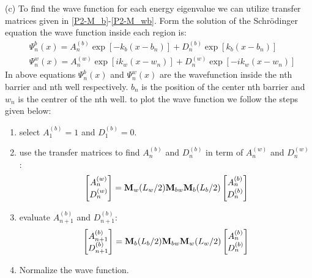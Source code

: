 \begin{homeworkProblem}
\begin{homeworkSection}{(c)}
To find the wave function  for each energy eigenvalue we can utilize transfer matrices given in \eqref{P2-M_b}-\eqref{P2-M_wb}. Form the solution of the Schr\"odinger equation the wave function inside each region is:
\begin{align}
&\Psi^{b}_{n}(x)=A^{(b)}_{n}\exp\left[-k_b(x-b_n)\right]+D^{(b)}_n\exp\left[k_b(x-b_n)\right]\\
&\Psi^{w}_{n}(x)=A^{(w)}_{n}\exp\left[ik_w(x-w_n)\right]+D^{(w)}_n\exp\left[-ik_w(x-w_n)\right]
\end{align}
In above equations $\Psi^{b}_{n}(x)$ and $\Psi^{w}_{n}(x)$ are the wavefunction inside the nth barrier and nth well respectively. $b_n$ is the position of the center nth barrier and $w_n$ is the centrer of the nth well. to plot the wave function we follow the steps given below:
\begin{enumerate}
\item
select $A^{(b)}_1=1$ and $D^{(b)}_1=0$.
\item
use the transfer matrices to find $A_{n}^{(b)}$  and $D_{n}^{(b)}$  in term of $A_{n}^{(w)}$  and $D_{n}^{(w)}$ :
\begin{equation*}
\begin{bmatrix}
A_{n}^{(w)}\\
D_{n}^{(w)}
\end{bmatrix}
=\mathbf{M}_{w}(L_w/2)\mathbf{M}_{bw}\mathbf{M}_{b}(L_b/2)
\begin{bmatrix}
A_{n}^{(b)}\\
D_{n}^{(b)}
\end{bmatrix}
\end{equation*}
\item
evaluate $A_{n+1}^{(b)}$  and $D_{n+1}^{(b)}$:
\begin{equation*}
\begin{bmatrix}
A_{n+1}^{(b)}\\
D_{n+1}^{(b)}
\end{bmatrix}
=\mathbf{M}_{b}(L_b/2)\mathbf{M}_{bw}\mathbf{M}_{w}(L_w/2)
\begin{bmatrix}
A_{n}^{(b)}\\
D_{n}^{(b)}
\end{bmatrix}
\end{equation*}
\item
Normalize the wave function.
\end{enumerate} 


\end{homeworkSection}
\end{homeworkProblem}
